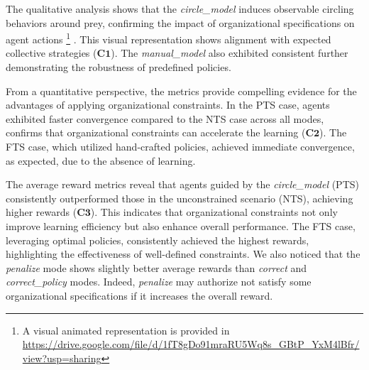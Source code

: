 \documentclass[runningheads]{llncs}
\theoremstyle{freethm}
\theoremstyle{proofoutline}
\begin{document}
%
%
%
The qualitative analysis shows that the \textit{circle\_model} induces observable circling behaviors around prey, confirming the impact of organizational specifications on agent actions
%
\footnote{A visual animated representation is provided in \url{https://drive.google.com/file/d/1fT8gDo91mraRU5Wq8s_GBtP_YxM4lBfr/view?usp=sharing}}
%
. This visual representation shows alignment with expected collective strategies ($\mathbf{C1}$). The \textit{manual\_model} also exhibited consistent further demonstrating the robustness of predefined policies.

From a quantitative perspective, the metrics provide compelling evidence for the advantages of applying organizational constraints. In the PTS case, agents exhibited faster convergence compared to the NTS case across all modes, confirms that organizational constraints can accelerate the learning ($\mathbf{C2}$). The FTS case, which utilized hand-crafted policies, achieved immediate convergence, as expected, due to the absence of learning.

The average reward metrics reveal that agents guided by the \textit{circle\_model} (PTS) consistently outperformed those in the unconstrained scenario (NTS), achieving higher rewards ($\mathbf{C3}$). This indicates that organizational constraints not only improve learning efficiency but also enhance overall performance. The FTS case, leveraging optimal policies, consistently achieved the highest rewards, highlighting the effectiveness of well-defined constraints. We also noticed that the \textit{penalize} mode shows slightly better average rewards than \textit{correct} and \textit{correct\_policy} modes. Indeed, \textit{penalize} may authorize not satisfy some organizational specifications if it increases the overall reward.
\end{document}
